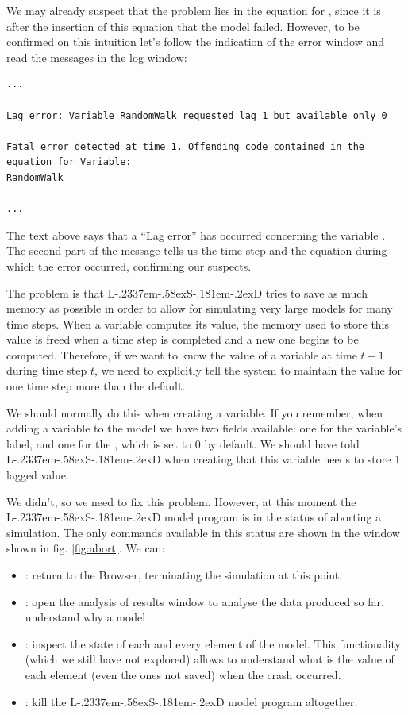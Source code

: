 \documentclass [11pt,a4paper] {book}
\def\LsD{{L\kern-.2337em\lower-.58ex\hbox{S}\kern-.181em\lower-.2ex\hbox{D}}\xspace}
\begin{document}
We may already suspect that the problem lies in the equation for , since
it is after the insertion of this equation that the model failed. However, to be
confirmed on this intuition let's follow the indication of the error window and read the messages
in the log window:
\small
\begin{verbatim}
...

Lag error: Variable RandomWalk requested lag 1 but available only 0

Fatal error detected at time 1. Offending code contained in the
equation for Variable:
RandomWalk

...
\end{verbatim}

\normalsize

The text above says that a ``Lag error'' has occurred concerning the variable
. The second part of the message tells us the time step and the equation
during which the error occurred, confirming our suspects.

The problem is that \LsD tries to save as much memory as possible in order to allow for
simulating very large models for many time steps. When a variable computes its value, the
memory used to store this value is freed when a time step is completed and a new one begins
to be computed. Therefore, if we want to know the value of a variable at time $t-1$ during
time step $t$, we need to explicitly tell the system to maintain the value for one time
step more than the default. 

We should normally do this when creating a variable. If you remember, when adding a
variable to the model we have two fields available: one for the variable's label, and one
for the , which is set to 0 by default. We should have told \LsD
when creating  that this variable needs to store 1 lagged value.

We didn't, so we need to fix this problem. However, at this moment the \LsD model program
is in the status of aborting a simulation. The only commands available in this status are
shown in the window shown in fig. \ref{fig:abort}. We can:

\begin{itemize}
  \item \menu{Return to \LsD Browser}: return to the Browser, terminating the simulation at this point.
  \item {}: open the analysis of results window to analyse the data produced so far.
  understand why a model
  \item {}: inspect the state of each and every element of the model. This
  functionality (which we still have not explored) allows to understand what is the value
  of each element (even the ones not saved) when the crash occurred.
  \item \menu{Quit the \LsD program}: kill the \LsD model program altogether.
\end{itemize}
\end{document}
